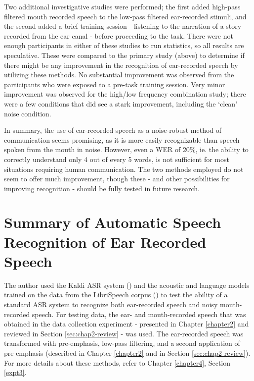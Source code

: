 Two additional investigative studies were performed; the first added high-pass filtered mouth recorded speech to the low-pass filtered ear-recorded stimuli, and the second added a brief training session - listening to the narration of a story recorded from the ear canal - before proceeding to the task.  There were not enough participants in either of these studies to run statistics, so all results are speculative.  These were compared to the primary study (above) to determine if there might be any improvement in the recognition of ear-recorded speech by utilizing these methods.  No substantial improvement was observed from the participants who were exposed to a pre-task training session.  Very minor improvement was observed for the high/low frequency combination study; there were a few conditions that did see a stark improvement, including the `clean' noise condition.

In summary, the use of ear-recorded speech as a noise-robust method of communication seems promising, as it is more easily recognizable than speech spoken from the mouth in noise.  However, even a WER of 20\%, ie. the ability to correctly understand only 4 out of every 5 words, is not sufficient for most situations requiring human communication.  The two methods employed do not seem to offer much improvement, though these - and other possibilities for improving recognition - should be fully tested in future research.



\section{Summary of Automatic Speech Recognition of Ear Recorded Speech}\label{sec:chap4-review}

The author used the Kaldi ASR system (\cite{povey:11}) and the acoustic and language models trained on the data from the LibriSpeech corpus (\cite{panayotov:15}) to test the ability of a standard ASR system to recognize both ear-recorded speech and noisy mouth-recorded speech.  For testing data, the ear- and mouth-recorded speech that was obtained in the data collection experiment - presented in Chapter \ref{chapter2} and reviewed in Section \ref{sec:chap2-review} - was used.  The ear-recorded speech was transformed with pre-emphasis, low-pass filtering, and a second application of pre-emphasis (described in Chapter \ref{chapter2} and in Section \ref{sec:chap2-review}). For more details about these methods, refer to Chapter \ref{chapter4}, Section \ref{expt3}.

